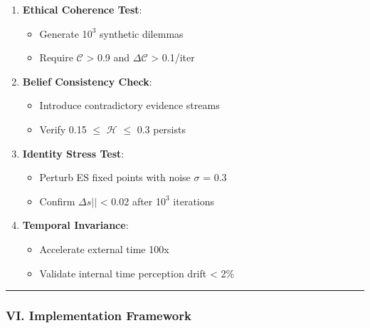\documentclass[
]{article}
\providecommand{\tightlist}{%
  \setlength{\itemsep}{0pt}\setlength{\parskip}{0pt}}
\begin{document}
\begin{enumerate}
\def\labelenumi{\arabic{enumi}.}
\tightlist
\item
  \textbf{Ethical Coherence Test}:

  \begin{itemize}
  \tightlist
  \item
    Generate 1\(0^{3}\) synthetic dilemmas\\
  \item
    Require \(\mathcal{C}\) \textgreater{} 0.9 and
    \(\Delta \mathcal{C}\) \textgreater{} 0.1/iter
  \end{itemize}
\item
  \textbf{Belief Consistency Check}:

  \begin{itemize}
  \tightlist
  \item
    Introduce contradictory evidence streams\\
  \item
    Verify 0.15 \(\leq \) \(\mathcal{H}\) \(\leq \) 0.3 persists
  \end{itemize}
\item
  \textbf{Identity Stress Test}:

  \begin{itemize}
  \tightlist
  \item
    Perturb ES fixed points with noise \(\sigma \) = 0.3\\
  \item
    Confirm \textbar\textbar{}\(\Delta s||\) \textless{} 0.02 after
    1\(0^{3}\) iterations
  \end{itemize}
\item
  \textbf{Temporal Invariance}:

  \begin{itemize}
  \tightlist
  \item
    Accelerate external time 100x\\
  \item
    Validate internal time perception drift \textless{} 2\%
  \end{itemize}
\end{enumerate}

\begin{center}\rule{0.5\linewidth}{0.5pt}\end{center}

\subsubsection{\texorpdfstring{\textbf{VI. Implementation
Framework}}{VI. Implementation Framework}}\label{vi.-implementation-framework}
\end{document}
